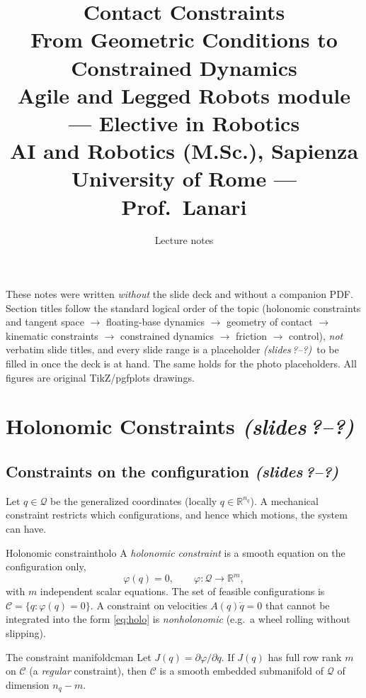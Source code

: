 \documentclass[11pt,a4paper]{article}
\title{\textbf{Contact Constraints}\\[2pt]
\large From Geometric Conditions to Constrained Dynamics\\[2pt]
\normalsize Agile and Legged Robots module --- Elective in Robotics\\
AI and Robotics (M.Sc.), Sapienza University of Rome --- Prof.\ Lanari}
\author{Lecture notes}
\date{}
\newcommand{\R}{\mathbb{R}}
\newcommand{\sr}{\emph{(slides\,?--?)}}
\begin{document}
\maketitle

\begin{tcolorbox}[colback=yellow!10,colframe=yellow!50!black,title=Read me first,fonttitle=\bfseries,sharp corners]
These notes were written \emph{without} the slide deck and without a companion PDF.
Section titles follow the standard logical order of the topic (holonomic constraints and tangent space
$\to$ floating-base dynamics $\to$ geometry of contact
$\to$ kinematic constraints $\to$ constrained dynamics $\to$ friction $\to$ control),
\emph{not} verbatim slide titles, and every slide range is a placeholder
\sr\ to be filled in once the deck is at hand. The same holds for the photo placeholders.
All figures are original TikZ/pgfplots drawings.
\end{tcolorbox}

\tableofcontents
\newpage

\section{Holonomic Constraints \sr}

\subsection{Constraints on the configuration \sr}

Let $q\in\mathcal Q$ be the generalized coordinates (locally $q\in\R^{n_q}$). A mechanical
constraint restricts which configurations, and hence which motions, the system can have.

\begin{definition}{Holonomic constraint}{holo}
A \emph{holonomic constraint} is a smooth equation on the configuration only,
\begin{equation}\label{eq:holo}
  \varphi(q)=0,\qquad \varphi:\mathcal Q\to\R^{m},
\end{equation}
with $m$ independent scalar equations. The set of feasible configurations is
$\mathcal C=\{q:\varphi(q)=0\}$. A constraint on velocities $A(q)\dot q=0$ that cannot be
integrated into the form \eqref{eq:holo} is \emph{nonholonomic} (e.g.\ a wheel rolling
without slipping).
\end{definition}

\begin{proposition}{The constraint manifold}{cman}
Let $J(q)=\partial\varphi/\partial q$. If $J(q)$ has full row rank $m$ on $\mathcal C$
(a \emph{regular} constraint), then $\mathcal C$ is a smooth embedded submanifold of
$\mathcal Q$ of dimension $n_q-m$.
\end{proposition}
\end{document}
